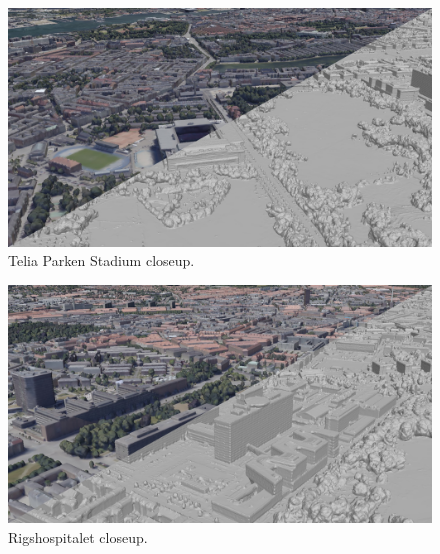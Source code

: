 \documentclass[10pt,letterpaper]{article}
\begin{document}
\begin{figure}
    \centering
    \capstart
    \begin{minipage}[b]{1.0\linewidth}
        \includegraphics[width=\textwidth]{images/copenhagen/results/closeups/diag/telia_parken_diag.jpg}
    \end{minipage}
    \caption{Telia Parken Stadium closeup.}
    \label{fig:closeup_stadium}
\end{figure}

\begin{figure}
    \centering
    \capstart
    \begin{minipage}[b]{1.0\linewidth}
        \includegraphics[width=\textwidth]{images/copenhagen/results/closeups/diag/rigshospitalet_diag.jpg}
    \end{minipage}
    \caption{Rigshospitalet closeup.}
    \label{fig:closeup_rigshospitalet}
\end{figure}
\end{document}
